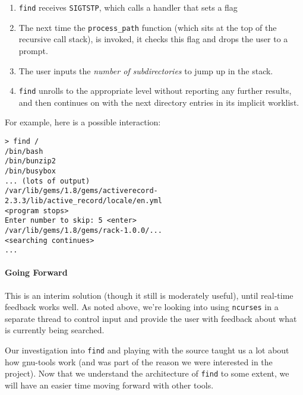 \documentclass{article}
\begin{document}
\begin{enumerate}
\item {\tt find} receives {\tt SIGTSTP}, which calls a handler that
  sets a flag
\item The next time the {\tt process\_path} function (which sits at
  the top of the recursive call stack), is invoked, it checks this
  flag and drops the user to a prompt.
\item The user inputs the \emph{number of subdirectories} to jump up
  in the stack.
\item {\tt find} unrolls to the appropriate level without reporting
  any further results, and then continues on with the next directory
  entries in its implicit worklist.
\end{enumerate}

For example, here is a possible interaction:

\begin{verbatim}
> find /
/bin/bash
/bin/bunzip2
/bin/busybox
... (lots of output)
/var/lib/gems/1.8/gems/activerecord-2.3.3/lib/active_record/locale/en.yml
<program stops>
Enter number to skip: 5 <enter>
/var/lib/gems/1.8/gems/rack-1.0.0/...
<searching continues>
...
\end{verbatim}

\paragraph{Going Forward}

This is an interim solution (though it still is moderately useful),
until real-time feedback works well.  As noted above, we're looking
into using {\tt ncurses} in a separate thread to control input and
provide the user with feedback about what is currently being searched.

Our investigation into {\tt find} and playing with the source taught
us a lot about how gnu-tools work (and was part of the reason we were
interested in the project).  Now that we understand the architecture
of {\tt find} to some extent, we will have an easier time moving
forward with other tools.
\end{document}
